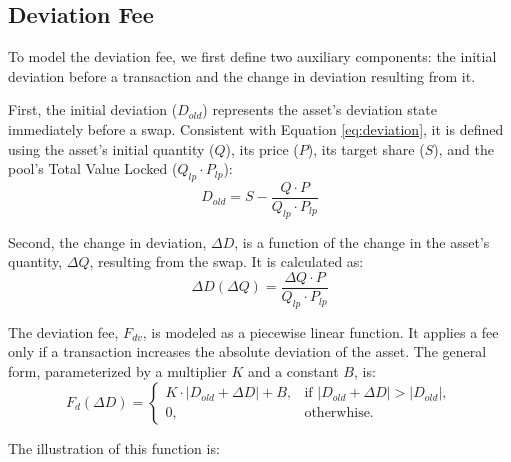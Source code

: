 \subsection{Deviation Fee}
To model the deviation fee, we first define two auxiliary components: the initial deviation before a transaction and the change in deviation resulting from it.

First, the initial deviation ($D_{old}$) represents the asset's deviation state immediately before a swap. Consistent with Equation \ref{eq:deviation}, it is defined using the asset's initial quantity ($Q$), its price ($P$), its target share ($S$), and the pool's Total Value Locked ($Q_{lp} \cdot P_{lp}$):
\begin{equation}
	\label{eq:deviation_old_function_formula}
	D_{old} = S - \frac{Q \cdot P}{Q_{lp} \cdot P_{lp}}
\end{equation}	

Second, the change in deviation, $\Delta D$, is a function of the change in the asset's quantity, $\Delta Q$, resulting from the swap. It is calculated as:
\begin{equation}
	\label{eq:deviation_delta_function_formula}
	\Delta D(\Delta Q) = \frac{ \Delta Q \cdot P}{Q_{lp} \cdot P_{lp}}
\end{equation}	

The deviation fee, $F_{dv}$, is modeled as a piecewise linear function. It applies a fee only if a transaction increases the absolute deviation of the asset. The general form, parameterized by a multiplier $K$ and a constant $B$, is:
\begin{equation}
	\label{eq:basic_deviation_function}
	F_d(\Delta D) = \begin{cases} 
		K \cdot \lvert D_{old} + \Delta D \rvert + B, & \text{if } \lvert D_{old} + \Delta D \rvert > \lvert D_{old} \rvert, \\
		0, & \text{otherwhise.}
	\end{cases}	
\end{equation}

The illustration of this function is:


